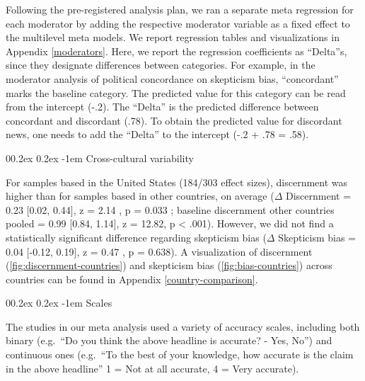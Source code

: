 \documentclass[
  doc,floatsintext]{apa6}
\makeatletter
\let\oldparagraph\paragraph
\renewcommand{\paragraph}{
    \@ifstar
      \xxxParagraphStar
      \xxxParagraphNoStar
  }
\newcommand{\xxxParagraphStar}[1]{\oldparagraph*{#1}\mbox{}}
\newcommand{\xxxParagraphNoStar}[1]{\oldparagraph{#1}\mbox{}}
\renewcommand{\paragraph}{\@startsection{paragraph}{4}{\parindent}%
  {0\baselineskip \@plus 0.2ex \@minus 0.2ex}%
  {-1em}%
  {\normalfont\normalsize\bfseries\itshape\typesectitle}}
\makeatother
\begin{document}
Following the pre-registered analysis plan, we ran a separate meta regression for each moderator by adding the respective moderator variable as a fixed effect to the multilevel meta models. We report regression tables and visualizations in Appendix \ref{moderators}. Here, we report the regression coefficients as ``Delta''s, since they designate differences between categories. For example, in the moderator analysis of political concordance on skepticism bias, ``concordant'' marks the baseline category. The predicted value for this category can be read from the intercept (-.2). The ``Delta'' is the predicted difference between concordant and discordant (.78). To obtain the predicted value for discordant news, one needs to add the ``Delta'' to the intercept (-.2 + .78 = .58).

\paragraph{Cross-cultural variability}\label{cross-cultural-variability}

For samples based in the United States (184/303 effect sizes), discernment was higher than for samples based in other countries, on average (\(\Delta\) Discernment = 0.23 {[}0.02, 0.44{]}, z = 2.14 , p = 0.033 ; baseline discernment other countries pooled = 0.99 {[}0.84, 1.14{]}, z = 12.82, p \textless{} .001). However, we did not find a statistically significant difference regarding skepticism bias (\(\Delta\) Skepticism bias = 0.04 {[}-0.12, 0.19{]}, z = 0.47 , p = 0.638). A visualization of discernment (\ref{fig:discernment-countries}) and skepticism bias (\ref{fig:bias-countries}) across countries can be found in Appendix \ref{country-comparison}.

\paragraph{Scales}\label{scales}

The studies in our meta analysis used a variety of accuracy scales, including both binary (e.g.~``Do you think the above headline is accurate? - Yes, No'') and continuous ones (e.g.~``To the best of your knowledge, how accurate is the claim in the above headline'' 1 = Not at all accurate, 4 = Very accurate).
\end{document}
